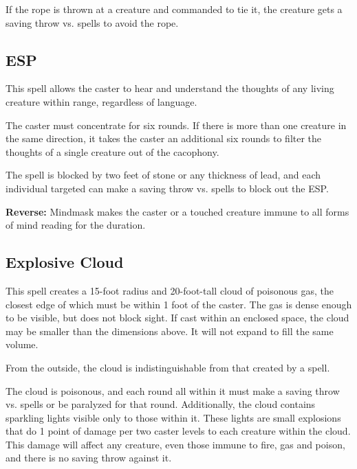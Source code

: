 \begin{multicols*}{2}
If the rope is thrown at a creature and commanded to tie it, the creature gets a saving throw vs. spells to avoid the rope.

\subsection{ESP}\label{spell:ESP}

This spell allows the caster to hear and understand the thoughts of any living creature within range, regardless of language.

The caster must concentrate for six rounds. If there is more than one creature in the same direction, it takes the caster an additional six rounds to filter the thoughts of a single creature out of the cacophony.

The spell is blocked by two feet of stone or any thickness of lead, and each individual targeted can make a saving throw vs. spells to block out the ESP.

\textbf{Reverse:} \hypertarget{spell:Mindmask}{Mindmask} makes the caster or a touched creature immune to all forms of mind reading for the duration.

\subsection{Explosive Cloud}\label{spell:Explosive Cloud}

This spell creates a 15-foot radius and 20-foot-tall cloud of poisonous gas, the closest edge of which must be within 1 foot of the caster. The gas is dense enough to be visible, but does not block sight. If cast within an enclosed space, the cloud may be smaller than the dimensions above. It will not expand to fill the same volume.

From the outside, the cloud is indistinguishable from that created by a  spell.

The cloud is poisonous, and each round all within it must make a saving throw vs. spells or be paralyzed for that round. Additionally, the cloud contains sparkling lights visible only to those within it. These lights are small explosions that do 1 point of damage per two caster levels to each creature within the cloud. This damage will affect any creature, even those immune to fire, gas and poison, and there is no saving throw against it.


\end{multicols*}
